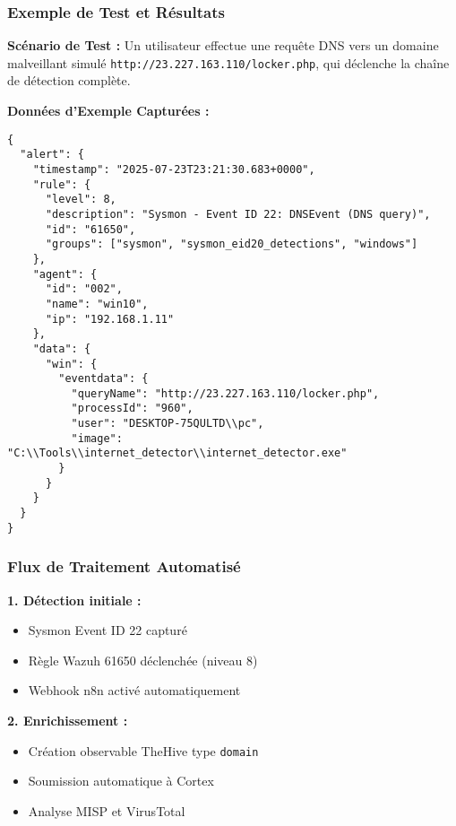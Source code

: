 \subsubsection{Exemple de Test et Résultats}

\textbf{Scénario de Test :}
Un utilisateur effectue une requête DNS vers un domaine malveillant simulé \texttt{http://23.227.163.110/locker.php}, qui déclenche la chaîne de détection complète.

\textbf{Données d'Exemple Capturées :}

\begin{lstlisting}[style=JSONStyle, caption=Alerte DNS Wazuh, label=lst:dns-alert]
{
  "alert": {
    "timestamp": "2025-07-23T23:21:30.683+0000",
    "rule": {
      "level": 8,
      "description": "Sysmon - Event ID 22: DNSEvent (DNS query)",
      "id": "61650",
      "groups": ["sysmon", "sysmon_eid20_detections", "windows"]
    },
    "agent": {
      "id": "002",
      "name": "win10",
      "ip": "192.168.1.11"
    },
    "data": {
      "win": {
        "eventdata": {
          "queryName": "http://23.227.163.110/locker.php",
          "processId": "960",
          "user": "DESKTOP-75QULTD\\pc",
          "image": "C:\\Tools\\internet_detector\\internet_detector.exe"
        }
      }
    }
  }
}
\end{lstlisting}

\subsubsection{Flux de Traitement Automatisé}

\textbf{1. Détection initiale :}
\begin{itemize}
    \item Sysmon Event ID 22 capturé
    \item Règle Wazuh 61650 déclenchée (niveau 8)
    \item Webhook n8n activé automatiquement
\end{itemize}

\textbf{2. Enrichissement :}
\begin{itemize}
    \item Création observable TheHive type \texttt{domain}
    \item Soumission automatique à Cortex
    \item Analyse MISP et VirusTotal
\end{itemize}

